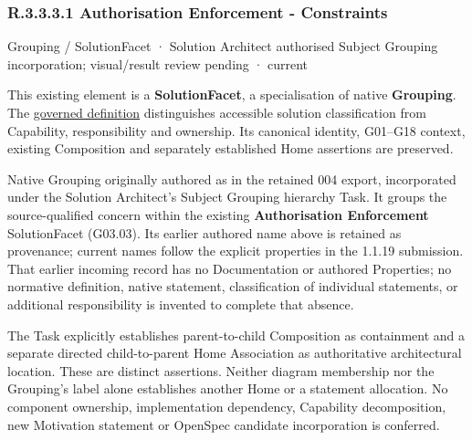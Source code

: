 \subsubsection*{R.3.3.3.1 Authorisation Enforcement - Constraints}
\label{navigation:R.3.3.3.1}

\label{element:202ebe880cc8456bb5e9f1389cc26fe8}
{\small Grouping / SolutionFacet · Solution Architect authorised Subject Grouping incorporation; visual/result review pending · current}\par

This existing element is a \textbf{SolutionFacet}, a specialisation of native
\textbf{Grouping}. The \href{\detokenize{../../../../../../../governance/continuum-representation.md#solutionfacet-classification--1119-candidate}}{governed definition}
distinguishes accessible solution classification from Capability, responsibility
and ownership. Its canonical identity, G01–G18 context, existing Composition
and separately established Home assertions are preserved.



Native Grouping originally authored as \texttt{} in the retained 004 export,
incorporated under the Solution Architect's Subject Grouping hierarchy Task.
It groups the source-qualified \texttt{} concern within
the existing \textbf{Authorisation Enforcement} SolutionFacet (G03.03). Its earlier authored name above is retained as provenance; current names
follow the explicit properties in the 1.1.19 submission.
That earlier incoming record has no Documentation or authored Properties; no normative
definition, native statement, classification of individual statements, or
additional responsibility is invented to complete that absence.



The Task explicitly establishes parent-to-child Composition as containment and
a separate directed child-to-parent Home Association as authoritative architectural
location. These are distinct assertions. Neither diagram membership nor the
Grouping's label alone establishes another Home or a statement allocation.
No component ownership, implementation dependency, Capability decomposition,
new Motivation statement or OpenSpec candidate incorporation is conferred.



